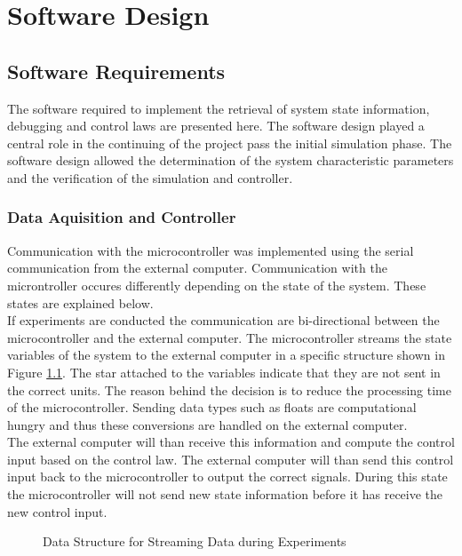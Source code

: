 \chapter{Software Design}
\label{chp5:software}
\section{Software Requirements}
\label{sec:software_requirements}
The software required to implement the retrieval of system state information, debugging and control laws are presented here. The software design played a central role in the continuing of the project pass the initial simulation phase. The software design allowed the determination of the system characteristic parameters and the verification of the simulation and controller.

\subsection{Data Aquisition and Controller}

Communication with the microcontroller was implemented using the serial communication from the external computer. Communication with the microntroller occures differently depending on the state of the system. These states are explained below.\\

If experiments are conducted the communication are bi-directional between the microcontroller and the external computer. The microcontroller streams the state variables of the system to the external computer in a specific structure shown in Figure \ref{fig:data_struct}. The star attached to the variables indicate that they are not sent in the correct units. The reason behind the decision is to reduce the processing time of the microcontroller. Sending data types such as floats are computational hungry and thus these conversions are handled on the external computer.\\

The external computer will than receive this information and compute the control input based on the control law. The external computer will than send this control input back to the microcontroller to output the correct signals. During this state the microcontroller will not send new state information before it has receive the new control input.

\begin{figure}[h]
	\centering
	
	\caption{Data Structure for Streaming Data during Experiments}
	\label{fig:data_struct}
\end{figure}

